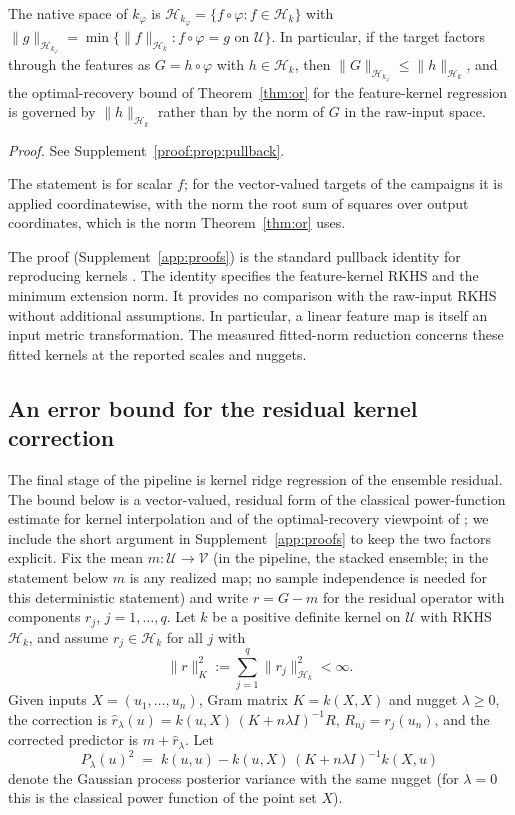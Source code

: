 \begin{proposition}\label{prop:pullback}
The native space of $k_\varphi$ is $\mathcal H_{k_\varphi}=\{f\circ\varphi:
f\in\mathcal H_k\}$ with
$\|g\|_{\mathcal H_{k_\varphi}}=\min\{\|f\|_{\mathcal H_k}: f\circ\varphi=g
\text{ on }\mathcal U\}$. In particular, if the target factors through the
features as $G=h\circ\varphi$ with $h\in\mathcal H_k$, then
$\|G\|_{\mathcal H_{k_\varphi}}\le\|h\|_{\mathcal H_k}$, and the
optimal-recovery bound of Theorem~\ref{thm:or} for the feature-kernel
regression is governed by $\|h\|_{\mathcal H_k}$ rather than by the norm of
$G$ in the raw-input space.
\end{proposition}
\noindent\emph{Proof.} See Supplement~\ref{proof:prop:pullback}.


The statement is for scalar $f$; for the vector-valued targets of the
campaigns it is applied coordinatewise, with the norm the root sum of squares
over output coordinates, which is the norm Theorem~\ref{thm:or} uses.

The proof (Supplement~\ref{app:proofs}) is the standard pullback identity for
reproducing kernels \citep{saitoh1997integral,paulsen2016introduction}. The identity specifies the feature-kernel RKHS and the minimum extension norm. It provides no comparison with the raw-input RKHS without additional assumptions. In particular, a linear feature map is itself an input metric transformation. The measured fitted-norm reduction concerns these fitted kernels at the reported scales and nuggets.

\subsection{An error bound for the residual kernel correction}
\label{sec:theory-or}

The final stage of the pipeline is kernel ridge regression of the ensemble
residual. The bound below is a vector-valued, residual form of the classical
power-function estimate for kernel interpolation
\citep{wendland2004scattered} and of the optimal-recovery viewpoint of
\citet{owhadi2019operator}; we include the short argument in
Supplement~\ref{app:proofs} to keep the two factors explicit. Fix the mean
$m:\mathcal U\to\mathcal V$ (in the pipeline, the stacked ensemble; in the
statement below $m$ is any realized map; no sample independence is needed for this deterministic statement) and
write $r=G-m$ for the residual operator with components $r_j$, $j=1,\dots,q$. Let $k$ be a positive definite kernel on $\mathcal U$ with
RKHS $\mathcal H_k$, and assume $r_j\in\mathcal H_k$ for all $j$ with
\[
\|r\|_K^2:=\sum_{j=1}^q\|r_j\|_{\mathcal H_k}^2<\infty .
\]
Given inputs $X=(u_1,\dots,u_n)$, Gram matrix $K=k(X,X)$ and nugget
$\lambda\ge 0$, the correction is
$\widehat r_\lambda(u)=k(u,X)\,(K+n\lambda I)^{-1}R$, $R_{nj}=r_j(u_n)$, and the
corrected predictor is $m+\widehat r_\lambda$. Let
\begin{equation}\label{eq:power}
P_\lambda(u)^2\;=\;k(u,u)-k(u,X)\,(K+n\lambda I)^{-1}k(X,u)
\end{equation}
denote the Gaussian process posterior variance with the same nugget (for
$\lambda=0$ this is the classical power function of the point set $X$).

